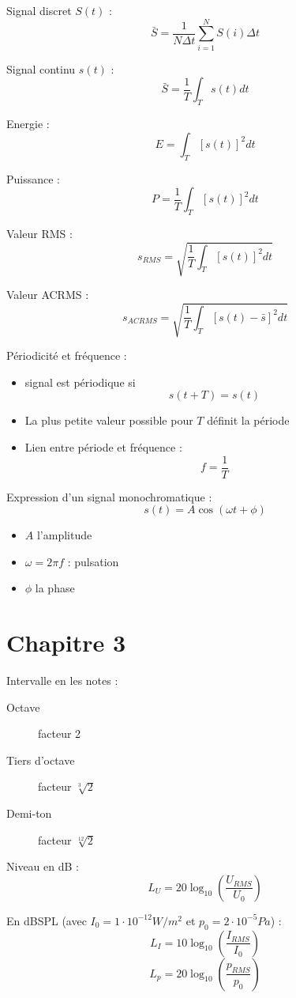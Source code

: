 \documentclass[a4paper, 11pt]{article}
\begin{document}
    Signal discret $S(t)$ :
    $$\bar{S} = \frac{1}{N\Delta t}\sum_{i=1}^NS(i)\Delta t$$

    Signal continu $s(t)$ :
    $$\bar{S} = \frac{1}{T}\int_Ts(t)dt$$

    Energie :
    $$E = \int_T [s(t)]^2dt$$

    Puissance :
    $$P = \frac{1}{T}\int_T[s(t)]^2dt$$

    Valeur RMS :
    $$s_{RMS} = \sqrt{\frac{1}{T}\int_T[s(t)]^2dt}$$
    
    Valeur ACRMS :
    $$s_{ACRMS} = \sqrt{\frac{1}{T}\int_T[s(t)-\bar{s}]^2dt}$$

    Périodicité et fréquence :
    \begin{itemize}
        \item signal est périodique si $$s(t+T) = s(t)$$
        \item La plus petite valeur possible pour $T$ définit la période
        \item Lien entre période et fréquence : $$f=\frac{1}{T}$$
    \end{itemize}

    Expression d'un signal monochromatique :
    $$s(t) = A\cos(\omega t+\phi)$$
    \begin{itemize}
        \item $A$ l'amplitude
        \item $\omega=2\pi f$ : pulsation
        \item $\phi$ la phase
    \end{itemize}

    \section{Chapitre 3}

    Intervalle en les notes :
    \begin{description}
        \item[Octave] facteur 2
        \item[Tiers d'octave] facteur $\sqrt[3]{2}$
        \item[Demi-ton] facteur $\sqrt[12]{2}$
    \end{description}

    Niveau en dB :
    $$L_U = 20\log_{10}\left(\frac{U_{RMS}}{U_0}\right)$$

    En dBSPL (avec $I_0=1\cdot10^{-12}W/m^2$ et $p_0=2\cdot10^{-5}Pa$) :
    $$L_I = 10\log_{10}\left(\frac{I_{RMS}}{I_0}\right)$$
    $$L_p = 20\log_{10}\left(\frac{p_{RMS}}{p_0}\right)$$
\end{document}
